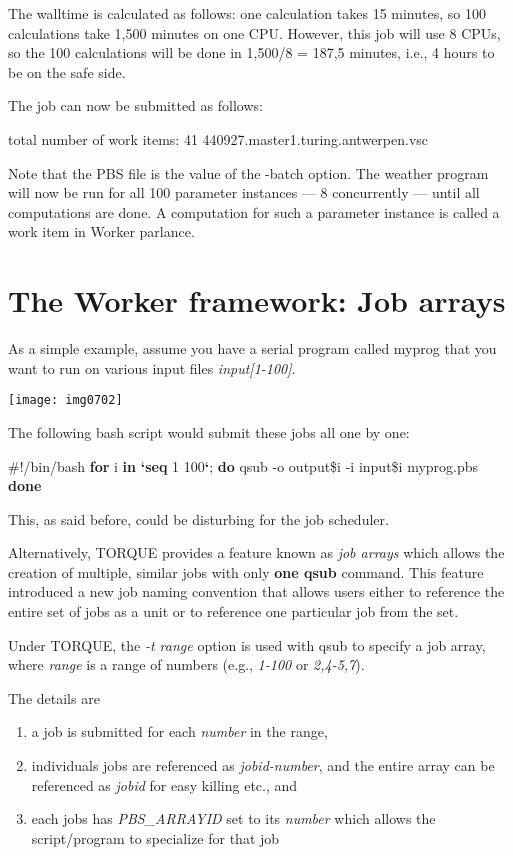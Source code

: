 \begin{description}
The walltime is calculated as follows: one calculation takes 15 minutes, so 100
calculations take 1,500 minutes on one CPU. However, this job will use 8 CPUs,
so the 100 calculations will be done in 1,500/8 = 187,5 minutes, i.e., 4 hours
to be on the safe side.

The job can now be submitted as follows:
\begin{prompt}
total number of work items: 41
440927.master1.turing.antwerpen.vsc
\end{prompt}

Note that the PBS file is the value of the -batch option. The weather program will now be run for all 100 parameter instances --- 8 concurrently --- until all computations are done. A computation for such a parameter instance is called a work item in Worker parlance.

\section{The Worker framework: Job arrays}

As a simple example, assume you have a serial program called myprog that you want to run on various input files \textit{input[1-100]}.

\texttt{[image: img0702]}

The following bash script would submit these jobs all one by one:
\begin{prog}
 \#!/bin/bash
 \textbf{for} i \textbf{in} \textbf{`seq} 1 100\textbf{`}; \textbf{do}
     qsub -o output\$i -i input\$i myprog.pbs
 \textbf{done}
\end{prog}

This, as said before, could be disturbing for the job scheduler.

Alternatively, TORQUE provides a feature known as \textit{job arrays} which allows the creation of multiple, similar jobs with only \textbf{one qsub} command. This feature introduced a new job naming convention that allows users either to reference the entire set of jobs as a unit or to reference one particular job from the set.

Under TORQUE, the \textit{-t range} option is used with qsub to specify a job array, where \textit{range} is a range of numbers (e.g., \textit{1-100} or \textit{2,4-5,7}).

The details are

\begin{enumerate}
\item  a job is submitted for each \textit{number} in the range,
\item  individuals jobs are referenced as \textit{jobid-number}, and the entire array can be referenced as \textit{jobid} for easy killing etc., and
\item  each jobs has \textit{PBS\_ARRAYID} set to its \textit{number} which allows the script/program to specialize for that job
\end{enumerate}


\end{description}
